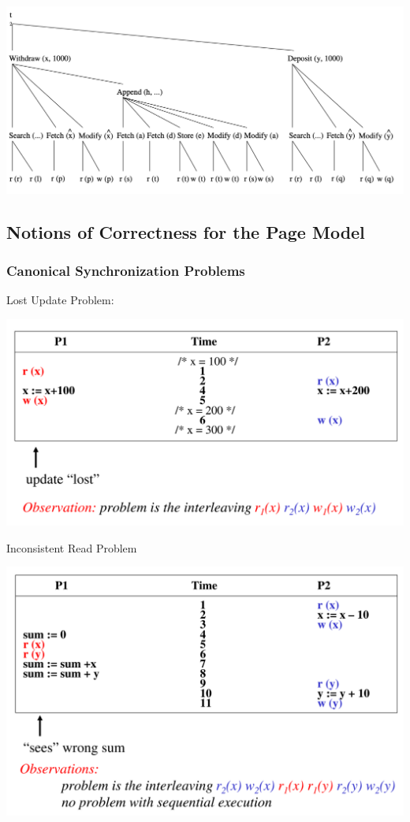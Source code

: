 \documentclass[11pt]{article}
\begin{document}
\begin{center}
\includegraphics[width=.8\textwidth]{../images/bigdatabase/1.png}
\label{}
\end{center}
\subsection{Notions of Correctness for the Page Model}
\label{sec:orgf6be71f}
\subsubsection{Canonical Synchronization Problems}
\label{sec:org073c1a1}

Lost Update Problem:
\begin{center}
\includegraphics[width=.8\textwidth]{../images/bigdatabase/2.png}
\label{}
\end{center}

Inconsistent Read Problem
\begin{center}
\includegraphics[width=.8\textwidth]{../images/bigdatabase/3.png}
\label{}
\end{center}
\end{document}
